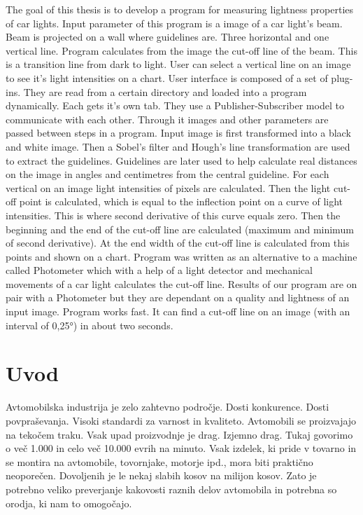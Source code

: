 \documentclass[oneside, a4paper, 12pt]{book}
\newcommand{\clearemptydoublepage}{\newpage{\pagestyle{empty}\cleardoublepage}}
\begin{document}
The goal of this thesis is to develop a program for measuring lightness properties of car lights. Input parameter of this program is a image of a car light's beam. Beam is projected on a wall where guidelines are. Three horizontal and one vertical line. Program calculates from the image the cut-off line of the beam. This is a transition line from dark to light. User can select a vertical line on an image to see it's light intensities on a chart. User interface is composed of a set of plug-ins. They are read from a certain directory and loaded into a program dynamically. Each gets it's own tab. They use a Publisher-Subscriber model to communicate with each other. Through it images and other parameters are passed between steps in a program. Input image is first transformed into a black and white image. Then a Sobel's filter and Hough's line transformation are used to extract the guidelines. Guidelines are later used to help calculate real distances on the image in angles and centimetres from the central guideline. For each vertical on an image light intensities of pixels are calculated. Then the light cut-off point is calculated, which is equal to the inflection point on a curve of light intensities. This is where second derivative of this curve equals zero. Then the beginning and the end of the cut-off line are calculated (maximum and minimum of second derivative). At the end width of the cut-off line is calculated from this points and shown on a chart. Program was written as an alternative to a machine called Photometer which with a help of a light detector and mechanical movements of a car light calculates the cut-off line. Results of our program are on pair with a Photometer but they are dependant on a quality and lightness of an input image. Program works fast. It can find a cut-off line on an image (with an interval of 0,25°) in about two seconds.

\clearemptydoublepage

\mainmatter
\setcounter{page}{1}
\pagestyle{fancy}

\chapter{Uvod}
Avtomobilska industrija je zelo zahtevno področje. Dosti konkurence. Dosti povpraševanja. Visoki standardi za varnost in kvaliteto. Avtomobili se proizvajajo na tekočem traku. Vsak upad proizvodnje je drag. Izjemno drag. Tukaj govorimo o več 1.000 in celo več 10.000 evrih na minuto. Vsak izdelek, ki pride v tovarno in se montira na avtomobile, tovornjake, motorje ipd., mora biti praktično neoporečen. Dovoljenih je le nekaj slabih kosov na milijon kosov. Zato je potrebno veliko preverjanje kakovosti raznih delov avtomobila in potrebna so orodja, ki nam to omogočajo.
\end{document}
